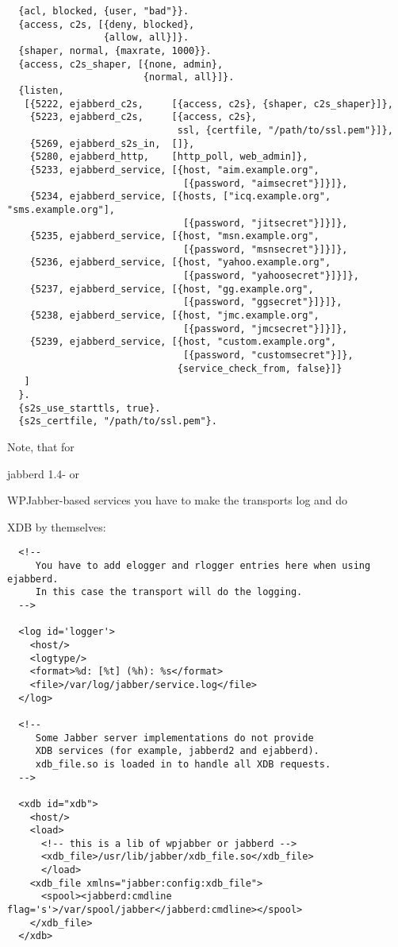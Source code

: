 \documentclass[a4paper,10pt]{book}
\newcommand{\ind}[1]{\begin{latexonly}\index{#1}\end{latexonly}}
\begin{document}
\begin{verbatim}
  {acl, blocked, {user, "bad"}}.
  {access, c2s, [{deny, blocked},
                 {allow, all}]}.
  {shaper, normal, {maxrate, 1000}}.
  {access, c2s_shaper, [{none, admin},
                        {normal, all}]}.
  {listen,
   [{5222, ejabberd_c2s,     [{access, c2s}, {shaper, c2s_shaper}]},
    {5223, ejabberd_c2s,     [{access, c2s},
                              ssl, {certfile, "/path/to/ssl.pem"}]},
    {5269, ejabberd_s2s_in,  []},
    {5280, ejabberd_http,    [http_poll, web_admin]},
    {5233, ejabberd_service, [{host, "aim.example.org",
                               [{password, "aimsecret"}]}]},
    {5234, ejabberd_service, [{hosts, ["icq.example.org", "sms.example.org"],
                               [{password, "jitsecret"}]}]},
    {5235, ejabberd_service, [{host, "msn.example.org",
                               [{password, "msnsecret"}]}]},
    {5236, ejabberd_service, [{host, "yahoo.example.org",
                               [{password, "yahoosecret"}]}]},
    {5237, ejabberd_service, [{host, "gg.example.org",
                               [{password, "ggsecret"}]}]},
    {5238, ejabberd_service, [{host, "jmc.example.org",
                               [{password, "jmcsecret"}]}]},
    {5239, ejabberd_service, [{host, "custom.example.org",
                               [{password, "customsecret"}]},
                              {service_check_from, false}]}
   ]
  }.
  {s2s_use_starttls, true}.
  {s2s_certfile, "/path/to/ssl.pem"}.
\end{verbatim}
Note, that for \ind{jabberd 1.4}jabberd 1.4- or \ind{WPJabber}WPJabber-based
services you have to make the transports log and do \ind{XDB}XDB by themselves:
\begin{verbatim}
  <!--
     You have to add elogger and rlogger entries here when using ejabberd.
     In this case the transport will do the logging.
  -->

  <log id='logger'>
    <host/>
    <logtype/>
    <format>%d: [%t] (%h): %s</format>
    <file>/var/log/jabber/service.log</file>
  </log>

  <!--
     Some Jabber server implementations do not provide
     XDB services (for example, jabberd2 and ejabberd).
     xdb_file.so is loaded in to handle all XDB requests.
  -->

  <xdb id="xdb">
    <host/>
    <load>
      <!-- this is a lib of wpjabber or jabberd -->
      <xdb_file>/usr/lib/jabber/xdb_file.so</xdb_file>
      </load>
    <xdb_file xmlns="jabber:config:xdb_file">
      <spool><jabberd:cmdline flag='s'>/var/spool/jabber</jabberd:cmdline></spool>
    </xdb_file>
  </xdb>
\end{verbatim}
\end{document}
